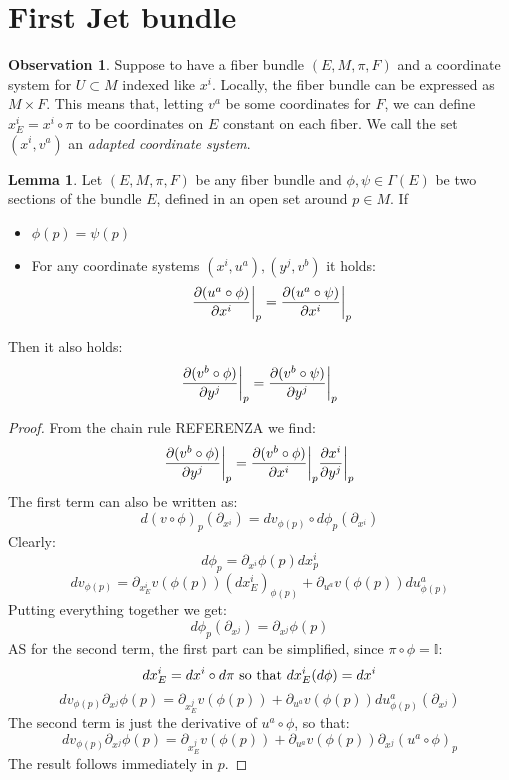 \documentclass[12pt,a4paper]{report}
\theoremstyle{definition}
\theoremstyle{Theorem}
\newtheorem{Lm}[Def]{Lemma}
\theoremstyle{definition}
\theoremstyle{definition}
\newtheorem{Obs}[Def]{Observation}
\begin{document}
	\section{First Jet bundle}
	\begin{Obs}
		Suppose to have a fiber bundle $(E,M,\pi,F)$ and a coordinate system for $U\subset M$ indexed like $x^i$. Locally, the fiber bundle can be expressed as $M\times F$. This means that, letting $v^a$ be some coordinates for $F$, we can define $x_E^i=x^i \circ \pi$ to be coordinates on $E$ constant on each fiber. We call the set $(x^i,v^a)$ an \textit{adapted coordinate system}.
	\end{Obs}
	\begin{Lm}
		Let $(E,M,\pi,F)$ be any fiber bundle and $\phi,\psi\in\Gamma(E)$ be two sections of the bundle $E$, defined in an open set around $p\in M$. If
		\begin{itemize}
			\item $\phi(p)=\psi(p)$ 
			\item For any coordinate systems $(x^i,u^a),(y^j,v^b)$ it holds:
			$${\partial(u^a\circ\phi) \over \partial{x^i}}\bigg|_p={\partial(u^a\circ\psi) \over \partial{x^i}}\bigg|_p$$
		\end{itemize} 
		Then it also holds:
		$${\partial(v^b\circ\phi) \over \partial{y^j}}\bigg|_p={\partial(v^b\circ\psi) \over \partial{y^j}}\bigg|_p$$
	\end{Lm}
	\begin{proof}
		From the chain rule REFERENZA we find:
		$${\partial(v^b\circ\phi) \over \partial{y^j}}\bigg|_p={\partial(v^b\circ\phi) \over \partial{x^i}}\bigg|_p{\partial x^i \over \partial{y^j}}\bigg|_p$$
		The first term can also be written as:
		$$d(v\circ \phi)_p(\partial_{x^i})=dv_{\phi(p)}\circ d\phi_p(\partial_{x^i})$$
		Clearly:
		$$d\phi_p=\partial_{x^i}\phi(p) dx^i_p$$
		$$dv_{\phi(p)}=\partial_{x^i_E}v(\phi(p)) (dx^i_E)_{\phi(p)}+\partial_{u^a}v(\phi(p)) du^a_{\phi(p)}$$
		Putting everything together we get:
		$$d\phi_p(\partial_{x^j})=\partial_{x^j}\phi(p)$$
		AS for the second term, the first part can be simplified, since $\pi\circ \phi=\mathbb{I}$:
		$$dx^i_E=dx^i\circ d\pi\hbox{ so that }dx^i_E(d\phi)=dx^i$$
		$$dv_{\phi(p)}\partial_{x^j}\phi(p)=\partial_{x^j_E}v(\phi(p))+\partial_{u^a}v(\phi(p)) du^a_{\phi(p)}(\partial_{x^j})$$
		The second term is just the derivative of $u^a\circ \phi$, so that:
		$$dv_{\phi(p)}\partial_{x^j}\phi(p)=\partial_{x^j_E}v(\phi(p))+\partial_{u^a}v(\phi(p)) \partial_{x^j}(u^a\circ \phi)_p$$
		The result follows immediately in $p$.
	\end{proof}
\end{document}

